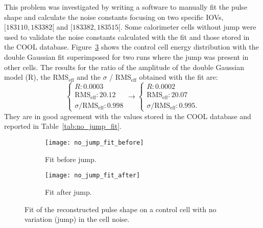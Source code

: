 This problem was investigated by writing a software to manually fit the pulse
shape and calculate the noise constants focusing on two specific IOVs,
$[183110, 183382[$ and $[183382, 183515[$. Some calorimeter cells without jump
were used to validate the noise constants calculated with the fit and those
stored in the COOL database. Figure~\ref{fig:no_jump_fit} shows the control cell
energy distribution with the double Gaussian fit superimposed for two runs where
the jump was present in other cells. The results for the ratio of the amplitude
of the double Gaussian model (R), the RMS$_{\text{eff}}$ and the $\sigma$ /
RMS$_{\text{eff}}$ obtained with the fit are:
\begin{equation}
  \begin{cases}
    R : 0.0003 \\
    \text{RMS}_{\text{eff}}: 20.12 \\
    \sigma / \text{RMS}_{\text{eff}}: 0.998
  \end{cases}
  \to
  \begin{cases}
    R : 0.0002 \\
    \text{RMS}_{\text{eff}} : 20.07 \\
    \sigma / \text{RMS}_{\text{eff}}: 0.995.
  \end{cases}
  \label{eq:74}
\end{equation}
They are in good agreement with the values stored in the COOL database and
reported in Table~\ref{tab:no_jump_fit}.

\begin{figure}[!h]
  \centering
  \begin{subfigure}[t]{.48\linewidth}
    \texttt{[image: no\_jump\_fit\_before]}
    \caption{Fit before jump.}
    \label{fig:no_jump_fit_before}
  \end{subfigure}
  \begin{subfigure}[t]{.48\linewidth}
    \texttt{[image: no\_jump\_fit\_after]}
    \caption{Fit after jump.}
    \label{fig:no_jump_fit_after}
  \end{subfigure}
  \caption{Fit of the reconstructed pulse shape on a control cell with no
    variation (jump) in the cell noise.}
  \label{fig:no_jump_fit}
\end{figure}

